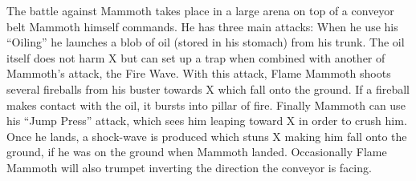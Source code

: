 The battle against Mammoth takes place in a large arena on top of a conveyor belt Mammoth himself commands. He has three main attacks: When he use his ``Oiling'' he launches a blob of oil (stored in his stomach\cite{wayback:X_resources}) from his trunk. The oil itself does not harm X but can set up a trap when combined with another of Mammoth's attack, the Fire Wave. With this attack, Flame Mammoth shoots several fireballs from his buster towards X which fall onto the ground. If a fireball makes contact with the oil, it bursts into pillar of fire. Finally Mammoth can use his ``Jump Press'' attack, which sees him leaping toward X in order to crush him. Once he lands, a shock-wave is produced which stuns X making him fall onto the ground, if he was on the ground when Mammoth landed. Occasionally Flame Mammoth will also trumpet inverting the direction the conveyor is facing. 

